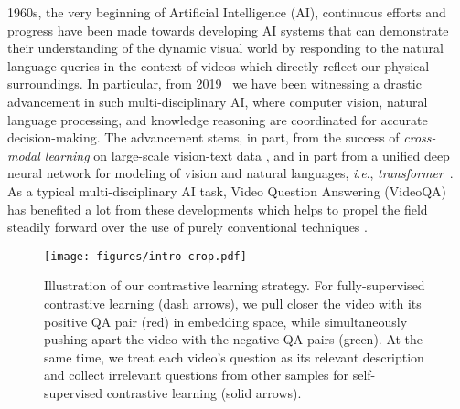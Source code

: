 \documentclass[10pt,journal,compsoc]{IEEEtran}
\newcommand{\trans}{\emph{transformer}}
\newcommand{\ie}{\textit{i}.\textit{e}.}
\begin{document}
\maketitle


\IEEEdisplaynontitleabstractindextext

\IEEEpeerreviewmaketitle



 1960s, the very beginning of Artificial Intelligence (AI), continuous efforts and progress have been made towards developing AI systems that can demonstrate their understanding of the dynamic visual world by responding to the natural language queries in the context of videos which directly reflect our physical surroundings. In particular, from 2019~\cite{devlin2018bert,bommasani2021opportunities} we have been witnessing a drastic advancement in such multi-disciplinary AI, where computer vision, natural language processing, and knowledge reasoning are coordinated for accurate decision-making. The advancement stems, in part, from the success of \emph{cross-modal learning} on large-scale vision-text data \cite{radford2021learning,lu2019vilbert,su2020vl,sun2019videobert,li2021align}, and in part from a unified deep neural network for modeling of vision and natural languages, \ie, \trans~\cite{vaswani2017attention}. 
As a typical multi-disciplinary AI task, Video Question Answering (VideoQA) has benefited a lot from these developments which helps to propel the field steadily forward over the use of purely conventional techniques \cite{zhong2022video,jang2017tgif,fan2019heterogeneous,gao2018motion,jiang2020reasoning,huang2020location,xiao2021video}.

\begin{figure}[t]
  \begin{center}
    \texttt{[image: figures/intro-crop.pdf]}
  \end{center}
  \vspace{-0.3cm}
  \caption{Illustration of our contrastive learning strategy. For fully-supervised contrastive learning (dash arrows), we pull closer the video with its positive QA pair (red) in embedding space, while simultaneously pushing apart the video with the negative QA pairs (green). At the same time, we treat each video's question as its relevant description and collect irrelevant questions from other samples for self-supervised contrastive learning (solid arrows).}
  \label{fig:intro}
  \vspace{-0.4cm}
\end{figure}
\end{document}
